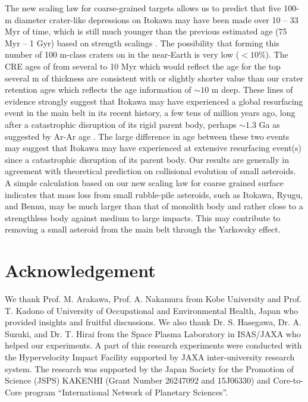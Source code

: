 \documentclass[3p,authoryear]{elsarticle}
\begin{document}
The new scaling law for coarse-grained targets allows us to predict that five 100-m diameter crater-like depressions on Itokawa may have been made over 10 -- 33 Myr of time, which is still much younger than the previous estimated age (75 Myr -- 1 Gyr) based on strength scalings \citep{michel2009}.
The possibility that forming this number of 100 m-class craters on in the near-Earth is very low ($<10$\%).
The CRE ages of from several to 10 Myr which would reflect the age for the top several m of thickness \citep{nagao2011, meier2014, nishiizumi2015} are consistent with or slightly shorter value than  our crater retention ages which reflects the age information of $\sim 10$ m deep.
These lines of evidence strongly suggest that Itokawa may have experienced a global resurfacing event in the main belt in its recent history, a few tens of million years ago, long after a catastrophic disruption of its rigid parent body, perhaps $\sim 1.3$ Ga as suggested by Ar-Ar age \citep{park2015}.
The large difference in age between these two events may suggest that Itokawa may have experienced at extensive resurfacing event(s) since a catastrophic disruption of its parent body.
Our results are generally in agreement with theoretical prediction on collisional evolution of small asteroids.
A simple calculation based on our new scaling law for coarse grained surface indicates that mass loss from small rubble-pile asteroids, such as Itokawa, Ryugu, and Bennu, may be much larger than that of monolith body and rather close to a strengthless body against medium to large impacts.
This may contribute to removing a small asteroid from the main belt through the Yarkovsky effect.

\section*{Acknowledgement}
We thank Prof. M. Arakawa, Prof. A. Nakamura from Kobe University and Prof. T. Kadono of University of Occupational and Environmental Health, Japan who provided insights and fruitful discussions. We also thank Dr. S. Hasegawa, Dr. A. Suzuki, and Dr. T. Hirai from the Space Plasma Laboratory in ISAS/JAXA who helped our experiments. A part of this research experiments were conducted with the Hypervelocity Impact Facility supported by JAXA inter-university research system.
The research was supported by the Japan Society for the Promotion of Science (JSPS) KAKENHI (Grant Number 26247092 and 15J06330) and Core-to-Core program ``International Network of Planetary Sciences''.
\end{document}
